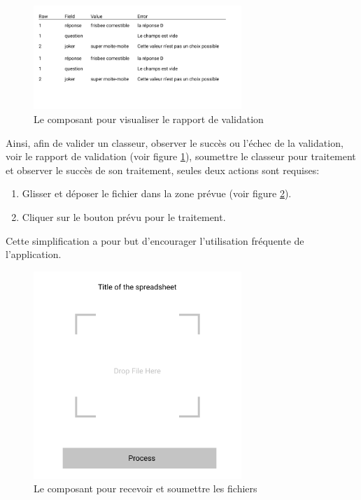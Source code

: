 \begin{figure}[ht]
    \centering
    \includegraphics[width=0.7\textwidth]{images/prototypes/spreadsheet-validation.png}
    \caption{Le composant pour visualiser le rapport de validation}
    \label{fig:spreadsheet-validation}
\end{figure}
Ainsi, afin de valider un classeur, observer le succès ou l'échec de la validation, voir le rapport de validation (voir figure \ref{fig:spreadsheet-validation}), soumettre le classeur pour traitement et observer le succès de son traitement, seules deux actions sont requises:
\begin{enumerate}
    \item Glisser et déposer le fichier dans la zone prévue (voir figure \ref{fig:spreadsheet-handler}).
    \item Cliquer sur le bouton prévu pour le traitement.
\end{enumerate}
Cette simplification a pour but d'encourager l'utilisation fréquente de l'application.
\begin{figure}[ht]
    \centering
    \includegraphics[width=0.7\textwidth]{images/prototypes/spreadsheet-handler.png}
    \caption{Le composant pour recevoir et soumettre les fichiers}
    \label{fig:spreadsheet-handler}
\end{figure}

